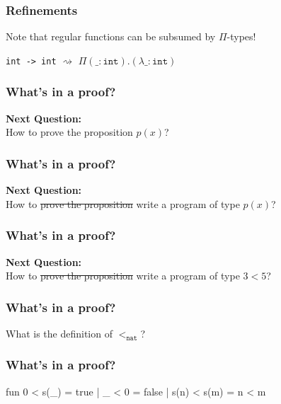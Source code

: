 \documentclass[usenames,dvipsnames]{beamer}
\begin{document}

\begin{frame}
  \frametitle{Refinements}

  Note that regular functions can be subsumed by $\Pi$-types!

  \texttt{int -> int} $\rightsquigarrow$ $\Pi(\_:\texttt{int}).
  (\lambda \_:\texttt{int})$
\end{frame}


\begin{frame}
  \frametitle{What's in a proof?}

  \textbf{Next Question:} \\
  How to prove the proposition $p(x)$?
\end{frame}


\begin{frame}
  \frametitle{What's in a proof?}

  \textbf{Next Question:} \\
  How to \sout{prove the proposition} write a program of type $p(x)$?
\end{frame}


\begin{frame}
  \frametitle{What's in a proof?}

  \textbf{Next Question:} \\
  How to \sout{prove the proposition} write a program of type $3 < 5$?
\end{frame}

\newcommand{\tNat}{\texttt{nat}}
\newcommand{\tInt}{\texttt{int}}


\begin{frame}
  \frametitle{What's in a proof?}

  What is the definition of $<_{\tNat}$?
\end{frame}


\begin{frame}[fragile]
  \frametitle{What's in a proof?}

  \begin{code}
    fun 0 < s(_) = true
      | _ < 0 = false
      | s(n) < s(m) = n < m
  \end{code}
\end{frame}
\end{document}
